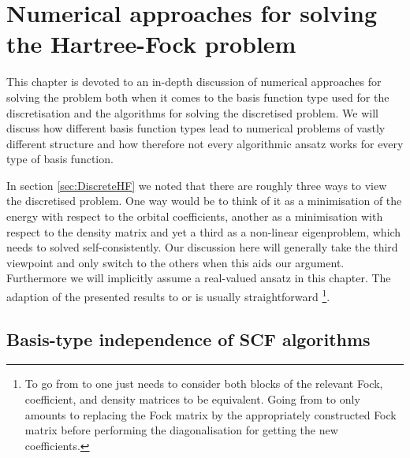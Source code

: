 \chapter{Numerical approaches for solving the Hartree-Fock problem}
\label{ch:NumSolveHF}
\newcommand{\kexp}{\ensuremath k_\text{exp}}

This chapter is devoted to an in-depth discussion of
numerical approaches for solving the \HF problem
both when it comes to the basis function type used for the discretisation
and the algorithms for solving the discretised problem.
We will discuss how different basis function types
lead to numerical problems of vastly different structure
and how therefore not every algorithmic ansatz works
for every type of basis function.

In section \ref{sec:DiscreteHF} we noted that there are
roughly three ways to view the discretised \HF problem.
One way would be to think of it as a minimisation of the energy
with respect to the orbital coefficients,
another as a minimisation with respect to the density matrix
and yet a third as a non-linear eigenproblem,
which needs to solved self-consistently.
Our discussion here will generally take the third viewpoint
and only switch to the others when this aids our argument.
Furthermore we will implicitly assume a real-valued
\UHF ansatz in this chapter.
The adaption of the presented results to
\RHF or \ROHF is usually straightforward%
\footnote{
To go from \UHF to \RHF one just needs to consider both blocks of the relevant
Fock, coefficient, and density matrices to be equivalent.
Going from \UHF to \ROHF only amounts to replacing the \UHF Fock matrix
by the appropriately constructed \ROHF Fock matrix before performing
the diagonalisation for getting the new coefficients.
}.






\section{Basis-type independence of SCF algorithms}


